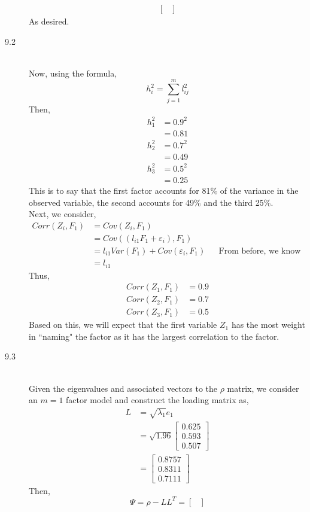 \documentclass[letterpaper,10pt]{article}
\begin{document}
\begin{description}
\begin{align*}
\begin{bmatrix}
\end{bmatrix}
\end{align*}
As desired.
\item[9.2]\hfill\\
Now, using the formula,
\[h_i^2=\sum_{j=1}^ml_{ij}^2\]
Then,
\begin{align*}
h_1^2 &= 0.9^2\\
&=0.81\\
h_2^2 &= 0.7^2\\
&=0.49\\
h_3^2 &= 0.5^2\\
&=0.25
\end{align*}
This is to say that the first factor accounts for 81\% of the variance in the observed variable, the second accounts for 49\% and the third 25\%.\\
Next, we consider,
\begin{align*}
Corr(Z_i,F_1) &= Cov(Z_i, F_1)\\
&=Cov((l_{i1}F_1+\varepsilon_i), F_1)\\
&=l_{i1}Var(F_1)+Cov(\varepsilon_i,F_1) && \text{From before, we know these values}\\
&=l_{i1}
\end{align*}
Thus,
\begin{align*}
Corr(Z_1,F_1) &= 0.9\\
Corr(Z_2,F_1) &= 0.7\\
Corr(Z_3,F_1) &= 0.5
\end{align*}
Based on this, we will expect that the first variable $Z_1$ has the most weight in ``naming" the factor as it has the largest correlation to the factor.
\item[9.3]\hfill\\
Given the eigenvalues and associated vectors to the $\rho$ matrix, we consider an $m=1$ factor model and construct the loading matrix as,
\begin{align*}
L &= \sqrt{\lambda_1}e_1\\
&=\sqrt{1.96}\begin{bmatrix}
0.625\\0.593\\0.507
\end{bmatrix}\\
&=\begin{bmatrix}
0.8757\\0.8311\\0.7111
\end{bmatrix}
\end{align*}
Then,
\[\Psi=\rho -LL^T=\begin{bmatrix}

\end{bmatrix}\]
\end{description}
\end{document}

